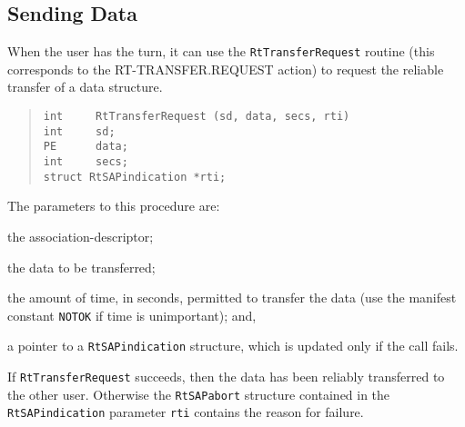 \subsection	{Sending Data}
When the user has the turn,
it can use the \verb"RtTransferRequest" routine
(this corresponds to the {\sf RT-TRANSFER.REQUEST\/} action)
to request the reliable transfer of a data structure.
\begin{quote}\small\begin{verbatim}
int     RtTransferRequest (sd, data, secs, rti)
int     sd;
PE      data;
int     secs;
struct RtSAPindication *rti;
\end{verbatim}\end{quote}
The parameters to this procedure are:
\begin{describe}
\item[\verb"sd":] the association-descriptor;

\item[\verb"data":] the data to be transferred;

\item[\verb"secs":] the amount of time, in seconds, permitted to transfer the
data (use the manifest constant \verb"NOTOK" if time is unimportant);
and,

\item[\verb"rti":] a pointer to a \verb"RtSAPindication" structure, which is
updated only if the call fails.
\end{describe}
If \verb"RtTransferRequest" succeeds,
then the data has been reliably transferred to the other user.
Otherwise the \verb"RtSAPabort" structure contained in
the \verb"RtSAPindication" parameter \verb"rti"
contains the reason for failure.

